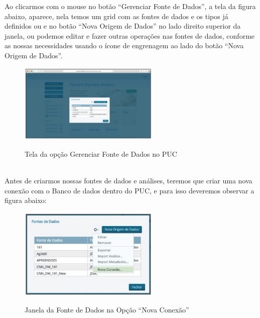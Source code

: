 Ao clicarmos com o mouse no bot\~{a}o ``Gerenciar Fonte de Dados'', a tela da figura abaixo, aparece, nela 
temos um grid com as fontes de dados e os tipos j\'{a} definidos ou e no bot\~{a}o ``Nova Origem de Dados'' 
no lado direito superior da janela, ou podemos editar e fazer outras opera\c{c}\~{o}es nas fontes de dados, 
conforme as nossas necessidades usando o \'{i}cone de engrenagem ao lado do bot\~{a}o ``Nova Origem de Dados''.

\begin{figure}[H]
	\vspace*{0,2cm}
    \centering
    \caption{Tela da op\c{c}\~{a}o Gerenciar Fonte de Dados no PUC}
    \includegraphics[width=0.6\textwidth]{./04-figuras/figura-puc-fonte-de-dados}
    \label{fig:ilustfigpucfontededados}
\end{figure}
\vspace*{-0,9cm}
{\raggedright {}} \\

Antes de criarmos nossas fontes de dados e an\'{a}lises, teremos que criar uma nova conex\~{a}o 
com o Banco de dados dentro do PUC, e para isso deveremos observar a figura abaixo:

\begin{figure}[H]
	\vspace*{0,2cm}
    \centering
    \caption{Janela da Fonte de Dados na Op\c{c}\~{a}o ``Nova Conex\~{a}o''}
    \includegraphics[width=0.6\textwidth]{./04-figuras/figura-puc-fonte-de-dados-nova-conexao}
    \label{fig:ilustfigppucfontededadosnovaconexao}
\end{figure}
\vspace*{-0,9cm}
{\raggedright {}} \\


